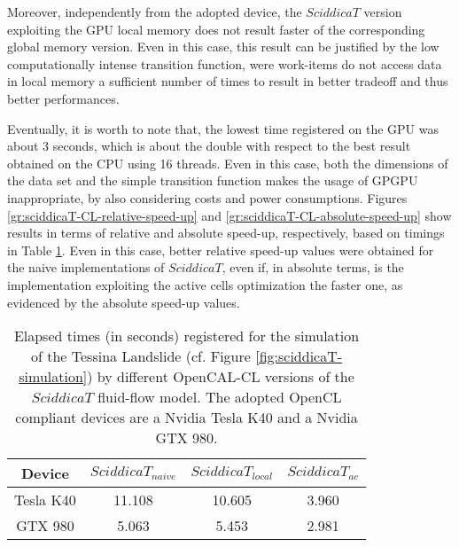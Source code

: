 Moreover, independently from the adopted device, the $SciddicaT$
version exploiting the GPU local memory does not result faster of
the corresponding global memory version. Even in this case, this
result can be justified by the low computationally intense
transition function, were work-items do not access data in local
memory a sufficient number of times to result in better tradeoff
and thus better performances.

Eventually, it is worth to note that, the lowest time registered
on the GPU was about 3 seconds, which is about the double with
respect to the best result obtained on the CPU using 16
threads. Even in this case, both the dimensions of the data set
and the simple transition function makes the usage of GPGPU
inappropriate, by also considering costs and power
consumptions. Figures \ref{gr:sciddicaT-CL-relative-speed-up} and
\ref{gr:sciddicaT-CL-absolute-speed-up} show results in terms of
relative and absolute speed-up, respectively, based on timings in
Table \ref{tab:sciddicaT-CL-execution-times}. Even in this case,
better relative speed-up values were obtained for the naive
implementations of $SciddicaT$, even if, in absolute terms, is the
implementation exploiting the active cells optimization the faster
one, as evidenced by the absolute speed-up values.

\begin{table}
	\centering
	\begin{tabular}{cccc}
		\hline Device & $SciddicaT_{naive}$ & $SciddicaT_{local}$ &
		$SciddicaT_{ac}$ \\ \hline Tesla K40 & 11.108 & 10.605 &
		3.960\\ GTX 980 & 5.063 & 5.453 & 2.981\\ \hline
	\end{tabular}
	\caption{Elapsed times (in seconds) registered for the simulation of the
		Tessina Landslide (cf. Figure \ref{fig:sciddicaT-simulation}) by
		different OpenCAL-CL versions of the $SciddicaT$ fluid-flow model. The
		adopted OpenCL compliant devices are a Nvidia Tesla K40 and a Nvidia
		GTX 980.}
	\label{tab:sciddicaT-CL-execution-times}
\end{table}

